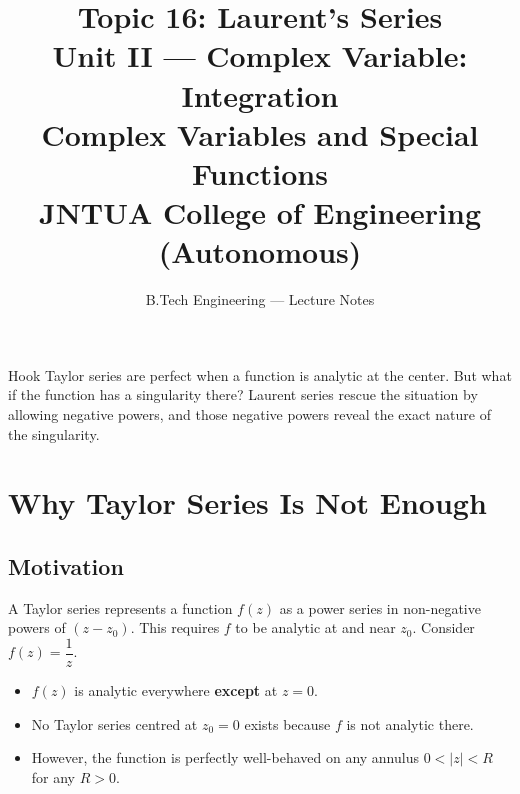 \documentclass[12pt,a4paper]{article}
\title{\textbf{Topic 16: Laurent's Series}\\[6pt]
       \large Unit II --- Complex Variable: Integration\\
       Complex Variables and Special Functions\\
       JNTUA College of Engineering (Autonomous)}
\author{B.Tech Engineering --- Lecture Notes}
\date{}
\begin{document}
\maketitle
\tableofcontents
\newpage

\begin{curiositybox}{Hook}
Taylor series are perfect when a function is analytic at the center. But what if the
function has a singularity there? Laurent series rescue the situation by allowing negative
powers, and those negative powers reveal the exact nature of the singularity.
\end{curiositybox}

\bigskip

\section{Why Taylor Series Is Not Enough}

\subsection*{Motivation}

A Taylor series represents a function $f(z)$ as a power series in non-negative powers of
$(z - z_0)$. This requires $f$ to be analytic at and near $z_0$. Consider $f(z)=\dfrac{1}{z}$.

\begin{itemize}
  \item $f(z)$ is analytic everywhere \textbf{except} at $z=0$.
  \item No Taylor series centred at $z_0 = 0$ exists because $f$ is not analytic there.
  \item However, the function is perfectly well-behaved on any annulus
        $0 < |z| < R$ for any $R > 0$.
\end{itemize}

\begin{center}
\end{center}
\end{document}

